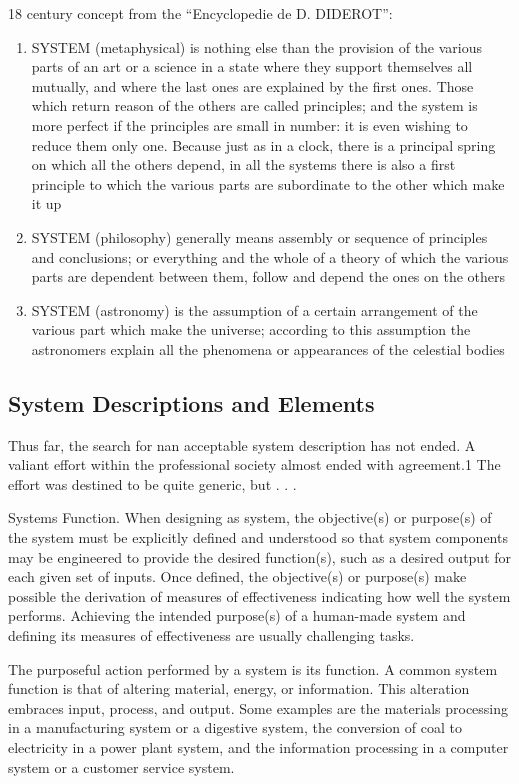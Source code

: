18 century concept from the ``Encyclopedie de D. DIDEROT'':
\begin{enumerate}
\item SYSTEM (metaphysical) is nothing else than the provision of the various parts of an art or a science in a state where they support themselves all mutually, and where the last ones are explained by the first ones. Those which return reason of the others are called principles; and the system is more perfect if the principles are small in number: it is even wishing to reduce them only one. Because just as in a clock, there is a principal spring on which all the others depend, in all the systems there is also a first principle to which the various parts are subordinate to the other which make it up
\item SYSTEM (philosophy) generally means assembly or sequence of principles and conclusions; or everything and the whole of a theory of which the various parts are dependent between them, follow and depend the ones on the others
\item SYSTEM (astronomy) is the assumption of a certain arrangement of the various part which make the universe; according to this assumption the astronomers explain all the phenomena or appearances of the celestial bodies
\end{enumerate}
    
\subsection{System Descriptions and Elements}\label{subsec:systemDescriptionsElements}

Thus far, the search for nan acceptable system description has not ended. A valiant effort within the professional society almost ended with agreement.1 The effort was destined to be quite generic, but . . . 

Systems Function. When designing as system, the objective(s) or purpose(s) of the system must be explicitly defined and understood so that system components may be engineered to provide the desired function(s), such as a desired output for each given set of inputs. Once defined, the objective(s) or purpose(s) make possible the derivation of measures of effectiveness indicating how well the system performs. Achieving the intended purpose(s) of a human-made system and defining its measures of effectiveness are usually challenging tasks.

The purposeful action performed by a system is its function. A common system function is that of altering material, energy, or information. This alteration embraces input, process, and output. Some examples are the materials processing in a manufacturing system or a digestive system, the conversion of coal to electricity in a power plant system, and the information processing in a computer system or a customer service system.


